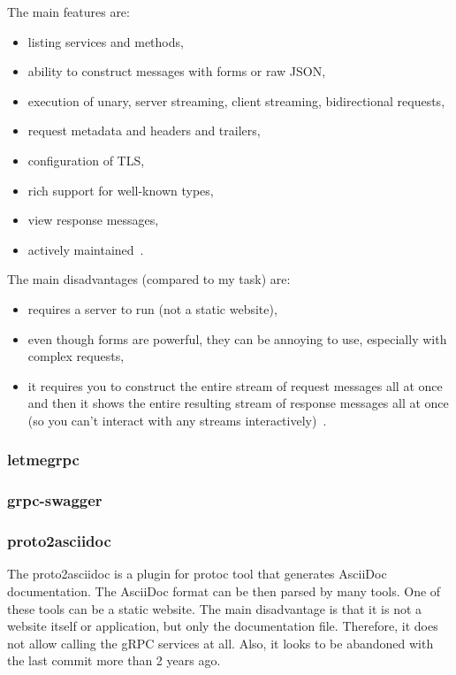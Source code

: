 The main features are:
\begin{itemize}
    \item listing services and methods,
    \item ability to construct messages with forms or raw JSON,
    \item execution of unary, server streaming, client streaming, bidirectional requests,
    \item request metadata and headers and trailers,
    \item configuration of TLS,
    \item rich support for well-known types,
    \item view response messages,
    \item actively maintained~\cite{grpc-grpcui}.
\end{itemize}

The main disadvantages (compared to my task) are:
\begin{itemize}
    \item requires a server to run (not a static website),
    \item even though forms are powerful, they can be annoying to use, especially with complex requests,
    \item it requires you to construct the entire stream of request messages all at once and then it shows the entire resulting stream of response messages all at once (so you can't interact with any streams interactively)~\cite{grpc-grpcui}.
\end{itemize}

\subsubsection{letmegrpc}

\subsubsection{grpc-swagger}

\subsubsection{proto2asciidoc}
The proto2asciidoc is a plugin for protoc tool that generates AsciiDoc documentation.
The AsciiDoc format can be then parsed by many tools.
One of these tools can be a static website.
The main disadvantage is that it is not a website itself or application, but only the documentation file.
Therefore, it does not allow calling the gRPC services at all.
Also, it looks to be abandoned with the last commit more than 2 years ago.
\cite{grpc-proto2asciidoc}

